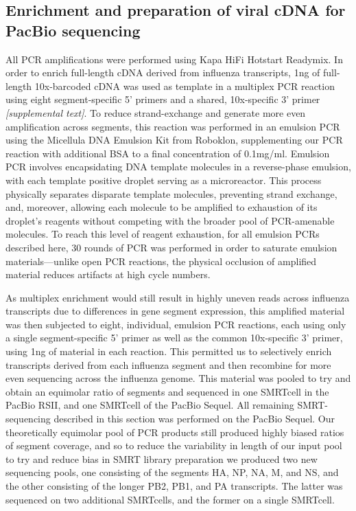 \documentclass[9pt,lineno]{elife}
\newcommand{\abrcomment}[1]{\emph{\color{blue} [#1]}}
\begin{document}
\subsection{Enrichment and preparation of viral cDNA for PacBio sequencing}
All PCR amplifications were performed using Kapa HiFi Hotstart Readymix.
In order to enrich full-length cDNA derived from influenza transcripts, 1ng of full-length 10x-barcoded cDNA was used as template in a multiplex PCR reaction using eight segment-specific 5' primers and a shared, 10x-specific 3' primer \abrcomment{supplemental text}.
To reduce strand-exchange and generate more even amplification across segments, this reaction was performed in an emulsion PCR using the Micellula DNA Emulsion Kit from Roboklon, supplementing our PCR reaction with additional BSA to a final concentration of 0.1mg/ml.
Emulsion PCR involves encapsidating DNA template molecules in a reverse-phase emulsion, with each template positive droplet serving as a microreactor.
This process physically separates disparate template molecules, preventing strand exchange, and, moreover, allowing each molecule to be amplified to exhaustion of its droplet's reagents without competing with the broader pool of PCR-amenable molecules.
To reach this level of reagent exhaustion, for all emulsion PCRs described here, 30 rounds of PCR was performed in order to saturate emulsion materials---unlike open PCR reactions, the physical occlusion of amplified material reduces artifacts at high cycle numbers.

As multiplex enrichment would still result in highly uneven reads across influenza transcripts due to differences in gene segment expression, this amplified material was then subjected to eight, individual, emulsion PCR reactions, each using only a single segment-specific 5' primer as well as the common 10x-specific 3' primer, using 1ng of material in each reaction.
This permitted us to selectively enrich transcripts derived from each influenza segment and then recombine for more even sequencing across the influenza genome.
This material was pooled to try and obtain an equimolar ratio of segments and sequenced in one SMRTcell in the PacBio RSII, and one SMRTcell of the PacBio Sequel. 
All remaining SMRT-sequencing described in this section was performed on the PacBio Sequel.
Our theoretically equimolar pool of PCR products still produced highly biased ratios of segment coverage, and so to reduce the variability in length of our input pool to try and reduce bias in SMRT library preparation we produced two new sequencing pools, one consisting of the segments HA, NP, NA, M, and NS, and the other consisting of the longer PB2, PB1, and PA transcripts. The latter was sequenced on two additional SMRTcells, and the former on a single SMRTcell.
\end{document}
